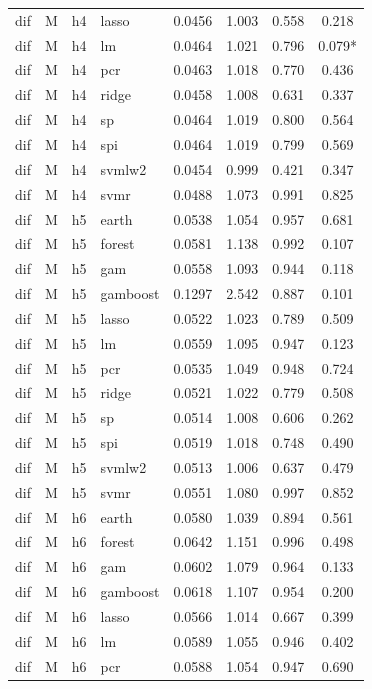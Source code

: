 \begin{ThreePartTable}
\begin{longtable}[t]{llclcccc}
dif & M & h4 & lasso & 0.0456 & 1.003 & 0.558 & 0.218\\
dif & M & h4 & lm & 0.0464 & 1.021 & 0.796 & 0.079*\\
dif & M & h4 & pcr & 0.0463 & 1.018 & 0.770 & 0.436\\
dif & M & h4 & ridge & 0.0458 & 1.008 & 0.631 & 0.337\\
dif & M & h4 & sp & 0.0464 & 1.019 & 0.800 & 0.564\\
dif & M & h4 & spi & 0.0464 & 1.019 & 0.799 & 0.569\\
dif & M & h4 & svmlw2 & 0.0454 & 0.999 & 0.421 & 0.347\\
dif & M & h4 & svmr & 0.0488 & 1.073 & 0.991 & 0.825\\
\addlinespace
dif & M & h5 & earth & 0.0538 & 1.054 & 0.957 & 0.681\\
dif & M & h5 & forest & 0.0581 & 1.138 & 0.992 & 0.107\\
dif & M & h5 & gam & 0.0558 & 1.093 & 0.944 & 0.118\\
dif & M & h5 & gamboost & 0.1297 & 2.542 & 0.887 & 0.101\\
dif & M & h5 & lasso & 0.0522 & 1.023 & 0.789 & 0.509\\
dif & M & h5 & lm & 0.0559 & 1.095 & 0.947 & 0.123\\
dif & M & h5 & pcr & 0.0535 & 1.049 & 0.948 & 0.724\\
dif & M & h5 & ridge & 0.0521 & 1.022 & 0.779 & 0.508\\
dif & M & h5 & sp & 0.0514 & 1.008 & 0.606 & 0.262\\
dif & M & h5 & spi & 0.0519 & 1.018 & 0.748 & 0.490\\
dif & M & h5 & svmlw2 & 0.0513 & 1.006 & 0.637 & 0.479\\
dif & M & h5 & svmr & 0.0551 & 1.080 & 0.997 & 0.852\\
\addlinespace
dif & M & h6 & earth & 0.0580 & 1.039 & 0.894 & 0.561\\
dif & M & h6 & forest & 0.0642 & 1.151 & 0.996 & 0.498\\
dif & M & h6 & gam & 0.0602 & 1.079 & 0.964 & 0.133\\
dif & M & h6 & gamboost & 0.0618 & 1.107 & 0.954 & 0.200\\
dif & M & h6 & lasso & 0.0566 & 1.014 & 0.667 & 0.399\\
dif & M & h6 & lm & 0.0589 & 1.055 & 0.946 & 0.402\\
dif & M & h6 & pcr & 0.0588 & 1.054 & 0.947 & 0.690\\

\end{longtable}
\end{ThreePartTable}
